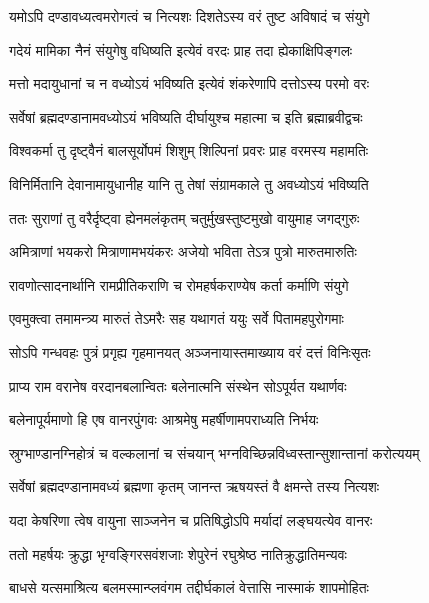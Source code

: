 \twolineshloka
{यमोऽपि दण्डावध्यत्वमरोगत्वं च नित्यशः}
{दिशतेऽस्य वरं तुष्ट अविषादं च संयुगे} %

\twolineshloka
{गदेयं मामिका नैनं संयुगेषु वधिष्यति}
{इत्येवं वरदः प्राह तदा ह्येकाक्षिपिङ्गलः} %

\twolineshloka
{मत्तो मदायुधानां च न वध्योऽयं भविष्यति}
{इत्येवं शंकरेणापि दत्तोऽस्य परमो वरः} %

\twolineshloka
{सर्वेषां ब्रह्मदण्डानामवध्योऽयं भविष्यति}
{दीर्घायुश्च महात्मा च इति ब्रह्माब्रवीद्वचः} %

\twolineshloka
{विश्वकर्मा तु दृष्ट्वैनं बालसूर्योपमं शिशुम्}
{शिल्पिनां प्रवरः प्राह वरमस्य महामतिः} %

\twolineshloka
{विनिर्मितानि देवानामायुधानीह यानि तु}
{तेषां संग्रामकाले तु अवध्योऽयं भविष्यति} %

\twolineshloka
{ततः सुराणां तु वरैर्दृष्ट्वा ह्येनमलंकृतम्}
{चतुर्मुखस्तुष्टमुखो वायुमाह जगद्गुरुः} %

\twolineshloka
{अमित्राणां भयकरो मित्राणामभयंकरः}
{अजेयो भविता तेऽत्र पुत्रो मारुतमारुतिः} %

\twolineshloka
{रावणोत्सादनार्थानि रामप्रीतिकराणि च}
{रोमहर्षकराण्येष कर्ता कर्माणि संयुगे} %

\twolineshloka
{एवमुक्त्वा तमामन्त्र्य मारुतं तेऽमरैः सह}
{यथागतं ययुः सर्वे पितामहपुरोगमाः} %

\twolineshloka
{सोऽपि गन्धवहः पुत्रं प्रगृह्य गृहमानयत्}
{अञ्जनायास्तमाख्याय वरं दत्तं विनिःसृतः} %

\twolineshloka
{प्राप्य राम वरानेष वरदानबलान्वितः}
{बलेनात्मनि संस्थेन सोऽपूर्यत यथार्णवः} %

\twolineshloka
{बलेनापूर्यमाणो हि एष वानरपुंगवः}
{आश्रमेषु महर्षीणामपराध्यति निर्भयः} %

\twolineshloka
{स्रुग्भाण्डानग्निहोत्रं च वल्कलानां च संचयान्}
{भग्नविच्छिन्नविध्वस्तान्सुशान्तानां करोत्ययम्} %

\twolineshloka
{सर्वेषां ब्रह्मदण्डानामवध्यं ब्रह्मणा कृतम्}
{जानन्त ऋषयस्तं वै क्षमन्ते तस्य नित्यशः} %

\twolineshloka
{यदा केषरिणा त्वेष वायुना साञ्जनेन च}
{प्रतिषिद्धोऽपि मर्यादां लङ्घयत्येव वानरः} %

\twolineshloka
{ततो महर्षयः क्रुद्धा भृग्वङ्गिरसवंशजाः}
{शेपुरेनं रघुश्रेष्ठ नातिक्रुद्धातिमन्यवः} %

\twolineshloka
{बाधसे यत्समाश्रित्य बलमस्मान्प्लवंगम}
{तद्दीर्घकालं वेत्तासि नास्माकं शापमोहितः} %

